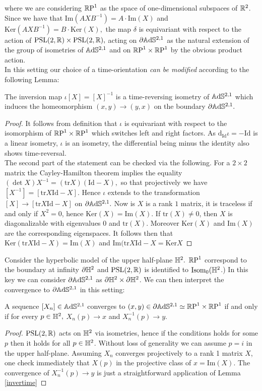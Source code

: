 where we are considering $\mathbb{R}\text{P}^1$ as the space of one-dimensional subspaces of $\mathbb{R}^2$. Since we have that $\text{Im}(AXB^{-1})=A\cdot\text{Im}(X)$ and $\text{Ker} (AXB^{-1})=B\cdot\text{Ker}(X),$ the map $\delta$ is equivariant with respect to the action of $\text{PSL}(2,\mathbb{R})\times\text{PSL}(2,\mathbb{R}),$ acting on $\partial\mathbb{A}\mathrm{d}\mathbb{S}^{2,1}$ as the natural extension of the group of isometries of $\mathbb{A}\mathrm{d}\mathbb{S}^{2,1}$ and on $\mathbb{R}\text{P}^1\times\mathbb{R}\text{P}^1$ by the obvious product action.\\
In this setting our choice of a time-orientation \textit{can be modified} according to the following Lemma:
\begin{lemma}\label{invertime}
    The inversion map $\iota[X]=[X]^{-1}$ is a time-reversing isometry of $\mathbb{A}\mathrm{d}\mathbb{S}^{2,1}$ which induces the homeomorphism $(x,y)\to(y,x)$ on the boundary $\partial\mathbb{A}\mathrm{d}\mathbb{S}^{2,1}.$
\end{lemma}
\begin{proof}
    It follows from definition that $\iota$ is equivariant with respect to the isomorphism of $\mathbb{R}\text{P}^1\times\mathbb{R}\text{P}^1$ which switches left and right factors. As $\text{d}_\text{Id}\iota=-\text{Id}$ is a linear isometry, $\iota$ is an isometry, the differential being minus the identity also shows time-reversal. \\
    The second part of the statement can be checked via the following. For a $2\times2$ matrix the Cayley-Hamilton theorem implies the equality $(\det X)X^{-1}=(\text{tr}X)(\text{Id}-X),$ so that projectively we have $[X^{-1}]=[\text{tr}X\text{Id}-X].$ Hence $\iota$ extends to the transformation $[X]\to[\text{tr}X\text{Id}-X]$ on $\partial\mathbb{A}\mathrm{d}\mathbb{S}^{2,1}.$ Now is $X$ is a rank $1$ matrix, it is traceless if and only if $X^2=0$, hence $\text{Ker}(X)=\text{Im}(X).$ If $\text{tr}(X)\neq 0$, then $X$ is diagonalizable with eigenvalues $0$ and $\text{tr}(X)$. Moreover $\text{Ker}(X)$ and $\text{Im}(X)$ are the corresponding eigenspaces. It follows then that $\text{Ker}(\text{tr}X\text{Id}-X)=\text{Im}(X)$ and $\text{Im}(\text{tr}X\text{Id}-X=\text{Ker}X$ 
\end{proof}


Consider the hyperbolic model of the upper half-plane $\mathbb{H}^2.$ $\mathbb{R}\text{P}^1$ correspond to the boundary at infinity $\partial\mathbb{H}^2$ and $\text{PSL}(2,\mathbb{R})$ is identified to $\text{Isom}_0(\mathbb{H}^2$.) In this key we can consider $\partial\mathbb{A}\mathrm{d}\mathbb{S}^{2,1}$ as $\partial\mathbb{H}^2\times\partial\mathbb{H}^2$. We can then interpret the convergence to $\partial\mathbb{A}\mathrm{d}\mathbb{S}^{2,1}$ in this setting:

\begin{lemma}\label{convergenza}
    A sequence $[X_n]\in\mathbb{A}\mathrm{d}\mathbb{S}^{2,1}$ converges to $(x,y)\in\partial\mathbb{A}\mathrm{d}\mathbb{S}^{2,1}\simeq\mathbb{R}\text{P}^1\times\mathbb{R}\text{P}^1$ if and only if for every $p\in\mathbb{H}^2,$ $X_n(p)\to x$ and $X_n^{-1}(p)\to y.$ 
\end{lemma}
\begin{proof}
    $\text{PSL}(2,\mathbb{R})$ acts on $\mathbb{H}^2$ via isometries, hence if the conditions holds for some $p$ then it holds for all $p\in\mathbb{H}^2$. Without loss of generality we can assume $p=i$ in the upper half-plane. Assuming $X_n$ converges projectively to a rank 1 matrix $X$, one check immediately that $X(p)$ in the projective class of $x=\text{Im}(X).$ The convergence of $X_n^{-1}(p)\to y$ is just a straightforward application of Lemma \ref{invertime}
\end{proof}

